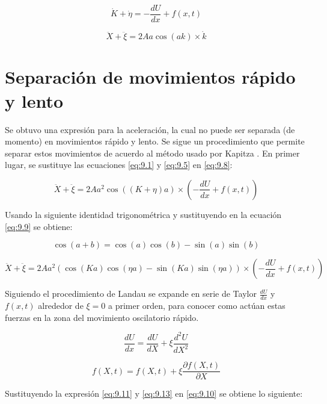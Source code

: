 \begin{equation}\label{eq:9.7}               \dot{K}+\dot{\eta}=-\frac{dU}{dx}+f(x,t)
\end{equation}

\begin{equation}\label{eq:9.8}
    \ddot{X}+\ddot{\xi}=2Aa\cos(ak)\times\dot{k}
\end{equation}

\section{Separación de movimientos rápido y lento}\label{cap:9.1.1}

Se obtuvo una expresión para la aceleración, la cual no puede ser separada (de momento) en movimientos rápido y lento. Se sigue un procedimiento que permite separar estos movimientos de acuerdo al método usado por Kapitza \cite{kapitza}. En primer lugar, se sustituye las ecuaciones \ref{eq:9.1} y \ref{eq:9.5} en \ref{eq:9.8}:
 
\begin{equation}\label{eq:9.9}
    \ddot{X}+\ddot{\xi}=2Aa^2\cos((K+\eta)a)\times(-\frac{dU}{dx}+f(x,t))
\end{equation}
    
Usando la siguiente identidad trigonométrica y sustituyendo en la ecuación \ref{eq:9.9} se obtiene:

$$\cos(a+b)=\cos(a)\cos(b)-\sin(a)\sin(b)$$

\begin{equation}\label{eq:9.10}
    \ddot{X}+\ddot{\xi}=2Aa^2(\cos(Ka)\cos(\eta a)-\sin(Ka)\sin(\eta     a))\times(-\frac{dU}{dx}+f(x,t))
\end{equation}

 Siguiendo el procedimiento de Landau \cite{landau} se expande en serie de Taylor $\frac{dU}{dx}$ y $f(x,t)$ alrededor de $\xi=0$ a primer orden, para conocer como actúan estas fuerzas en la zona del movimiento oscilatorio rápido.

\begin{equation}\label{eq:9.11}
    \frac{dU}{dx}=\frac{dU}{dX}+\xi\frac{d^2U}{dX^2}
\end{equation}
    
\begin{equation}\label{eq:9.12}
    f(X,t)=f(X,t) + \xi \frac{\partial f(X,t)}{\partial X} 
\end{equation}

Sustituyendo la expresión \ref{eq:9.11} y \ref{eq:9.13} en \ref{eq:9.10} se obtiene lo siguiente: 
    
